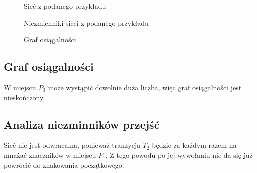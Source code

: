 \begin{figure}[h!]
	\caption{Sieć z podanego przykładu}
	\label{zad2:graph1}
\end{figure}

\begin{figure}[h!]
	\caption{Niezmienniki sieci z podanego przykładu}
	\label{zad2:graph1}
\end{figure}
\begin{figure}[h!]
	\caption{Graf osiągalności}
	\label{zad2:graph1}
\end{figure}
\newpage
\subsection{Graf osiągalności}
W miejscu $P_3$ może wystąpić dowolnie duża liczba, więc graf osiągalności jest nieskończony.
\subsection{Analiza niezminników przejść}
Sieć nie jest odwracalna, ponieważ tranzycja $T_2$ będzie za każdym razem na-
mnażać znaczników w miejscu $P_1$. Z tego powodu po jej wywołaniu nie da się już powrócić
do znakowania początkowego.